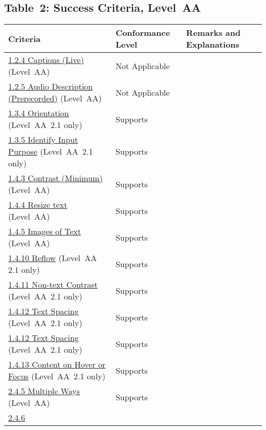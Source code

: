 \documentclass{report}
\begin{document}
\subsection{Table~2:  Success Criteria, Level~AA}
\begin{longtable}{p{}<{\RaggedRight}p{}<{\RaggedRight}p{}<{\RaggedRight}}
  \toprule
  Criteria & Conformance Level & Remarks and Explanations \\
  \midrule
  \endhead
  \bottomrule
  \endfoot
  \href{http://www.w3.org/TR/WCAG20/#media-equiv-real-time-captions}{1.2.4
  Captions (Live)} (Level~AA) & Not Applicable\\
  \href{http://www.w3.org/TR/WCAG20/#media-equiv-audio-desc-only}{1.2.5
  Audio Description (Prerecorded)} (Level~AA) & Not Applicable\\
  \href{https://www.w3.org/TR/WCAG21/#orientation}{1.3.4 Orientation}
  (Level~AA~2.1 only) & Supports\\
  \href{https://www.w3.org/TR/WCAG21/#identify-input-purpose}{1.3.5
  Identify Input Purpose} (Level~AA~2.1 only) & Supports\\
  \href{http://www.w3.org/TR/WCAG20/#visual-audio-contrast-contrast}{1.4.3
  Contrast (Minimum)} (Level~AA) & Supports\\
  \href{https://www.w3.org/TR/WCAG21/#resize-text}{1.4.4 Resize text}
  (Level~AA) & Supports\\
  \href{http://www.w3.org/TR/WCAG20/#visual-audio-contrast-text-presentation}{1.4.5
  Images of Text} (Level~AA) & Supports\\
  \href{https://www.w3.org/TR/WCAG21/#reflow}{1.4.10 Reflow} (Level~AA
  2.1 only) & Supports\\
  \href{https://www.w3.org/TR/WCAG21/#non-text-contrast}{1.4.11
  Non-text Contrast} (Level~AA~2.1 only) & Supports\\
  \href{https://www.w3.org/TR/WCAG21/#text-spacing}{1.4.12 Text
  Spacing} (Level~AA~2.1 only) & Supports\\
  \href{https://www.w3.org/TR/WCAG21/#text-spacing}{1.4.12 Text
  Spacing} (Level~AA~2.1 only) & Supports\\
  \href{https://www.w3.org/TR/WCAG21/#content-on-hover-or-focus}{1.4.13
  Content on Hover or Focus} (Level~AA~2.1 only) & Supports\\
  \href{http://www.w3.org/TR/WCAG20/#navigation-mechanisms-mult-loc}{2.4.5
  Multiple Ways} (Level~AA) & Supports\\
  \href{http://www.w3.org/TR/WCAG20/#navigation-mechanisms-descriptive}{2.4.6
}
\end{longtable}
\end{document}
